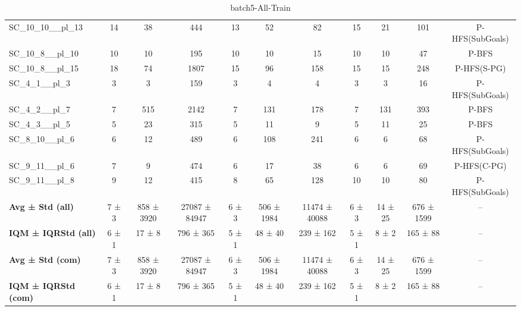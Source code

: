 \begin{table}[!ht]
\begin{tabular}{l|ccc|ccc|cccc}
SC\_10\_10\_\_pl\_13 & 14 & 38 & 444 & 13 & 52 & 82 & 15 & 21 & 101 & P-HFS(SubGoals) \\
SC\_10\_8\_\_pl\_10 & 10 & 10 & 195 & 10 & 10 & 15 & 10 & 10 & 47 & P-BFS \\
SC\_10\_8\_\_pl\_15 & 18 & 74 & 1807 & 15 & 96 & 158 & 15 & 15 & 248 & P-HFS(S-PG) \\
SC\_4\_1\_\_pl\_3 & 3 & 3 & 159 & 3 & 4 & 4 & 3 & 3 & 16 & P-HFS(SubGoals) \\
SC\_4\_2\_\_pl\_7 & 7 & 515 & 2142 & 7 & 131 & 178 & 7 & 131 & 393 & P-BFS \\
SC\_4\_3\_\_pl\_5 & 5 & 23 & 315 & 5 & 11 & 9 & 5 & 11 & 25 & P-BFS \\
SC\_8\_10\_\_pl\_6 & 6 & 12 & 489 & 6 & 108 & 241 & 6 & 6 & 68 & P-HFS(SubGoals) \\
SC\_9\_11\_\_pl\_6 & 7 & 9 & 474 & 6 & 17 & 38 & 6 & 6 & 69 & P-HFS(C-PG) \\
SC\_9\_11\_\_pl\_8 & 9 & 12 & 415 & 8 & 65 & 128 & 10 & 10 & 80 & P-HFS(SubGoals) \\
\hline
\textbf{Avg ± Std (all)} & 7 ± 3 & 858 ± 3920 & 27087 ± 84947 & 6 ± 3 & 506 ± 1984 & 11474 ± 40088 & 6 ± 3 & 14 ± 25 & 676 ± 1599 & -- \\
\textbf{IQM ± IQRStd (all)} & 6 ± 1 & 17 ± 8 & 796 ± 365 & 5 ± 1 & 48 ± 40 & 239 ± 162 & 5 ± 1 & 8 ± 2 & 165 ± 88 & -- \\
\textbf{Avg ± Std (com)} & 7 ± 3 & 858 ± 3920 & 27087 ± 84947 & 6 ± 3 & 506 ± 1984 & 11474 ± 40088 & 6 ± 3 & 14 ± 25 & 676 ± 1599 & -- \\
\textbf{IQM ± IQRStd (com)} & 6 ± 1 & 17 ± 8 & 796 ± 365 & 5 ± 1 & 48 ± 40 & 239 ± 162 & 5 ± 1 & 8 ± 2 & 165 ± 88 & -- \\
\end{tabular}
\caption{batch5-All-Train}
\label{tab:batch5_All_comparison_train}
\end{table}
